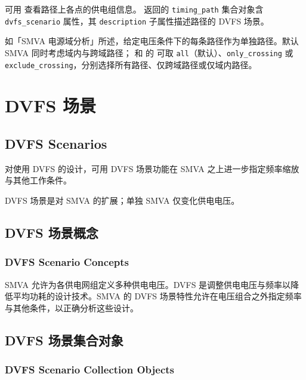 
可用  查看路径上各点的供电组信息。 返回的 \texttt{timing\_path} 集合对象含 \texttt{dvfs\_scenario} 属性，其 \texttt{description} 子属性描述路径的 DVFS 场景。

如「SMVA 电源域分析」所述，给定电压条件下的每条路径作为单独路径。默认 SMVA 同时考虑域内与跨域路径； 和  的  可取 \texttt{all}（默认）、\texttt{only\_crossing} 或 \texttt{exclude\_crossing}，分别选择所有路径、仅跨域路径或仅域内路径。

\section{DVFS 场景}
\subsection*{DVFS Scenarios}

对使用 DVFS 的设计，可用 DVFS 场景功能在 SMVA 之上进一步指定频率缩放与其他工作条件。

\begin{noteBox}
DVFS 场景是对 SMVA 的扩展；单独 SMVA 仅变化供电电压。
\end{noteBox}

\subsection{DVFS 场景概念}
\subsubsection*{DVFS Scenario Concepts}

SMVA 允许为各供电网组定义多种供电电压。DVFS 是调整供电电压与频率以降低平均功耗的设计技术。SMVA 的 DVFS 场景特性允许在电压组合之外指定频率与其他条件，以正确分析这些设计。

\subsection{DVFS 场景集合对象}
\subsubsection*{DVFS Scenario Collection Objects}

